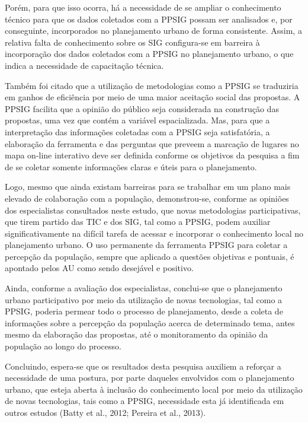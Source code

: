 \documentclass{article}
\begin{document}
Porém, para que isso ocorra, há a necessidade de se ampliar o conhecimento
técnico
para que os dados coletados com a PPSIG possam ser analisados e, por
conseguinte,
incorporados no planejamento urbano de forma consistente. Assim, a relativa
falta de
conhecimento sobre os SIG configura-se em barreira à incorporação dos dados
coletados com a PPSIG no planejamento urbano, o que indica a necessidade de
capacitação técnica.

Também foi citado que a utilização de metodologias como a PPSIG se traduziria em
ganhos de eficiência por meio de uma maior aceitação social das propostas. A
PPSIG
facilita que a opinião do público seja considerada na construção das propostas,
uma
vez que contém a variável espacializada. Mas, para que a interpretação das
informações coletadas com a PPSIG seja satisfatória, a elaboração da ferramenta
e
das perguntas que preveem a marcação de lugares no mapa on-line interativo deve
ser
definida conforme os objetivos da pesquisa a fim de se coletar somente
informações
claras e úteis para o planejamento.

Logo, mesmo que ainda existam barreiras para se trabalhar em um plano mais
elevado de
colaboração com a população, demonstrou-se, conforme as opiniões dos
especialistas
consultados neste estudo, que novas metodologias participativas, que tirem
partido
das TIC e dos SIG, tal como a PPSIG, podem auxiliar significativamente na
difícil
tarefa de acessar e incorporar o conhecimento local no planejamento urbano. O
uso
permanente da ferramenta PPSIG para coletar a percepção da população, sempre que
aplicado a questões objetivas e pontuais, é apontado pelos AU como sendo
desejável e
positivo.

Ainda, conforme a avaliação dos especialistas, conclui-se que o planejamento
urbano
participativo por meio da utilização de novas tecnologias, tal como a PPSIG,
poderia
permear todo o processo de planejamento, desde a coleta de informações sobre a
percepção da população acerca de determinado tema, antes mesmo da elaboração das
propostas, até o monitoramento da opinião da população ao longo do processo.

Concluindo, espera-se que os resultados desta pesquisa auxiliem a reforçar a
necessidade de uma postura, por parte daqueles envolvidos com o planejamento
urbano,
que esteja aberta à inclusão do conhecimento local por meio da utilização de
novas
tecnologias, tais como a PPSIG, necessidade esta já identificada em outros
estudos
(Batty et al., 2012; Pereira et al., 2013).
\end{document}
